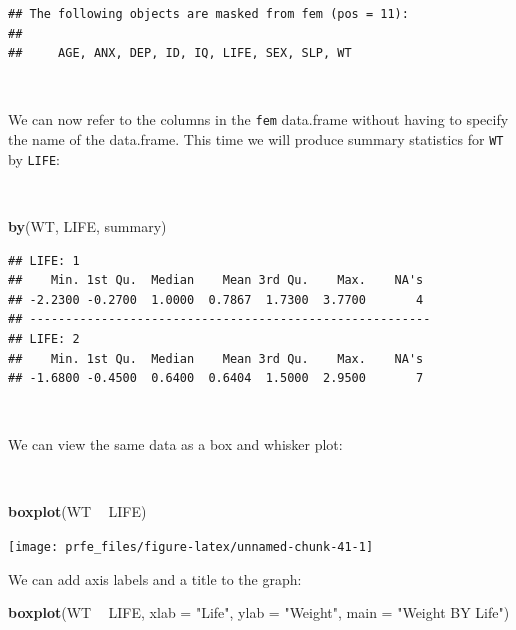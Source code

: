 \documentclass[12pt,a4paper]{book}
\newenvironment{Shaded}{\begin{snugshade}}{\end{snugshade}}
\newcommand{\KeywordTok}[1]{\textcolor[rgb]{0.13,0.29,0.53}{\textbf{#1}}}
\newcommand{\DataTypeTok}[1]{\textcolor[rgb]{0.13,0.29,0.53}{#1}}
\newcommand{\StringTok}[1]{\textcolor[rgb]{0.31,0.60,0.02}{#1}}
\newcommand{\OperatorTok}[1]{\textcolor[rgb]{0.81,0.36,0.00}{\textbf{#1}}}
\newcommand{\NormalTok}[1]{#1}
\theoremstyle{definition}
\theoremstyle{definition}
\theoremstyle{definition}
\theoremstyle{remark}
\begin{document}
\begin{verbatim}
## The following objects are masked from fem (pos = 11):
## 
##     AGE, ANX, DEP, ID, IQ, LIFE, SEX, SLP, WT
\end{verbatim}

~

We can now refer to the columns in the \texttt{fem} data.frame without
having to specify the name of the data.frame. This time we will produce
summary statistics for \texttt{WT} by \texttt{LIFE}:

~

\begin{Shaded}
\begin{Highlighting}[]
\KeywordTok{by}\NormalTok{(WT, LIFE, summary)}
\end{Highlighting}
\end{Shaded}

\begin{verbatim}
## LIFE: 1
##    Min. 1st Qu.  Median    Mean 3rd Qu.    Max.    NA's 
## -2.2300 -0.2700  1.0000  0.7867  1.7300  3.7700       4 
## -------------------------------------------------------- 
## LIFE: 2
##    Min. 1st Qu.  Median    Mean 3rd Qu.    Max.    NA's 
## -1.6800 -0.4500  0.6400  0.6404  1.5000  2.9500       7
\end{verbatim}

~

We can view the same data as a box and whisker plot:

~

\begin{Shaded}
\begin{Highlighting}[]
\KeywordTok{boxplot}\NormalTok{(WT }\OperatorTok{~}\StringTok{ }\NormalTok{LIFE)}
\end{Highlighting}
\end{Shaded}

\begin{center}\texttt{[image: prfe\_files/figure-latex/unnamed-chunk-41-1]} \end{center}

\newpage

We can add axis labels and a title to the graph:

\begin{Shaded}
\begin{Highlighting}[]
\KeywordTok{boxplot}\NormalTok{(WT }\OperatorTok{~}\StringTok{ }\NormalTok{LIFE,}
        \DataTypeTok{xlab =} \StringTok{"Life"}\NormalTok{,}
        \DataTypeTok{ylab =} \StringTok{"Weight"}\NormalTok{,}
        \DataTypeTok{main =} \StringTok{"Weight BY Life"}\NormalTok{)}
\end{Highlighting}
\end{Shaded}
\end{document}
